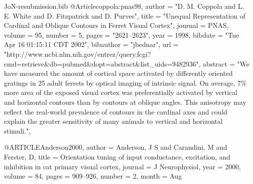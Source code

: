 \documentclass{article}
\begin{document}
\begin{filecontents}{JoN-resubmission.bib}
@Article{coppola:pnas98,
  author       = "D. M. Coppola and L. E. White and D. Fitzpatrick and
                  D. Purves",
  title	       = "Unequal Representation of Cardinal and Oblique
                  Contours in Ferret Visual Cortex",
  journal      = PNAS,
  volume       = 95,
  number       = 5,
  pages	       = "2621--2623",
  year	       = 1998,
  bibdate      = "Tue Apr 16 01:15:11 CDT 2002",
  bibauthor    = "jbednar",
  url	       = "http://www.ncbi.nlm.nih.gov/entrez/query.fcgi?cmd=retrieve&db=pubmed&dopt=abstract&list_uids=9482936",
  abstract     = "We have measured the amount of cortical space
                  activated by differently oriented gratings in 25
                  adult ferrets by optical imaging of intrinsic
                  signal. On average, 7\% more area of the exposed
                  visual cortex was preferentially activated by
                  vertical and horizontal contours than by contours at
                  oblique angles. This anisotropy may reflect the
                  real-world prevalence of contours in the cardinal
                  axes and could explain the greater sensitivity of
                  many animals to vertical and horizontal stimuli.",
}

@ARTICLE{Anderson2000,
  author = {Anderson, J S and Carandini, M and Ferster, D},
  title = {{Orientation tuning of input conductance, excitation, and inhibition
	in cat primary visual cortex}},
  journal = {J Neurophysiol},
  year = {2000},
  volume = {84},
  pages = {909--926},
  number = {2},
  month = {Aug}
}


\end{filecontents}
\end{document}
